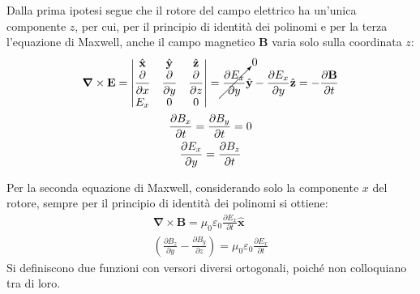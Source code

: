 \documentclass{article}
\newcommand{\vect}[1]{\boldsymbol{\mathbf{#1}}}
\numberwithin{equation}{subsection}
\begin{document}
Dalla prima ipotesi segue che il rotore del campo elettrico ha un'unica componente $z$, per cui, per il principio di identità dei polinomi e per la terza l'equazione di Maxwell, 
anche il campo magnetico $\vect{B}$ varia solo sulla coordinata $z$: 
\begin{gather*}
    \vect\nabla\times\vect{E}=
    \begin{vmatrix}
        \hat{\vect{x}} &\hat{\vect{y}}&\hat{\vect{z}}\\
        \displaystyle\frac{\partial}{\partial x}&\displaystyle\frac{\partial}{\partial y}&\displaystyle\frac{\partial}{\partial z}\\
        E_x&0&0
    \end{vmatrix}=
    \displaystyle\cancelto{0}{\frac{\partial E_x}{\partial y}}\hat{\vect{y}}-\frac{\partial E_x}{\partial y}\hat{\vect{z}}=-\frac{\partial \vect{B}}{\partial t}\\
    \displaystyle\frac{\partial B_x}{\partial t}=\frac{\partial B_y}{\partial t}=0\\
    \displaystyle\frac{\partial E_x}{\partial y}=\frac{\partial B_z}{\partial t}
\end{gather*}

Per la seconda equazione di Maxwell, considerando solo la componente $x$ del rotore, sempre per il principio di identità dei polinomi si ottiene:
\begin{gather*}
    \vect\nabla\times\vect{B}=\mu_0\varepsilon_0\displaystyle\frac{\partial E_x}{\partial t}\hat{\vect{x}}\\
    \left(\displaystyle\frac{\partial B_z}{\partial y}-\frac{\partial B_y}{\partial z}\right)=\mu_0\varepsilon_0\frac{\partial E_x}{\partial t}
\end{gather*}
Si definiscono due funzioni con versori diversi ortogonali, poiché non colloquiano tra di loro. 
\end{document}
